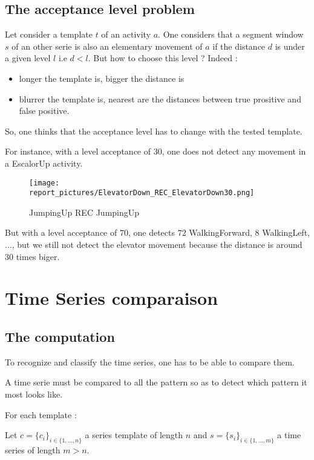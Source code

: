 \documentclass[a4,12pt]{article}
\begin{document}
	
	\subsection{The acceptance level problem}
	
	Let consider a template $t$ of an activity $a$.
	One considers that a segment window $s$ of an other serie is also an elementary movement of $a$ if the distance $d$ is under a given level $l$ i.e $d<l$.
	But how to choose this level ? Indeed :
	\begin{itemize}
		\item longer the template is, bigger the distance is
		\item blurrer the template is, nearest are the distances between true prositive and false positive.
	\end{itemize}

	So, one thinks that the acceptance level has to change with the tested template. 
	
	For instance, with a level acceptance of $30$, one does not detect any movement in a EscalorUp activity.
	
	\begin{figure}[H]
		\centering
		\texttt{[image: report\_pictures/ElevatorDown\_REC\_ElevatorDown30.png]}
		\caption{JumpingUp REC JumpingUp}
		\label{JumpingUp_REC_JumpingUp}
	\end{figure}
	
	But with a level acceptance of $70$, one detects $72$ WalkingForward, $8$ WalkingLeft, ..., but we still not detect the elevator movement because the distance is around $30$ times biger.
	
	\section{Time Series comparaison}
	
	\subsection{The computation}
	
	To recognize and classify the time series, one has to be able to compare them.
	
	A time serie must be compared to all the pattern so as to detect which pattern it most looks like.
	
	For each template :
	
	Let $c=\{c_i\}_{ i \in \{1, ..., n\} }$ a series template of length $n$ and $s=\{s_i\}_{ i \in \{1, ..., m\} }$ a time series of length $m>n$.
	
\end{document}
